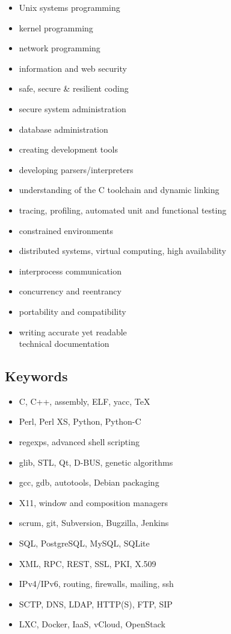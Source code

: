 \documentclass[a4paper,12pt]{article}
\newcommand{\compress}{\setlength\itemsep{-\parskip}}
\newenvironment{compressedItemize}{\begin{itemize}\compress}{\end{itemize}}
\begin{document}
\begin{multicols}{3}
\begin{compressedItemize}
\item	Unix systems programming
\item	kernel programming
\item	network programming
\item	information and web security
\item	safe, secure \& resilient coding
\item	secure system administration
\item	database administration
\columnbreak
\item	creating development tools
\item	developing parsers/interpreters
\item	understanding of the C tool\-chain and dynamic linking
\item	tracing, profiling, automated unit and functional testing
\item	constrained environments
\columnbreak
\item	distributed systems,
	virtual computing,
	high availability
\item	interprocess communication
\item	concurrency and reentrancy
\item	portability and compatibility
\item	writing accurate yet readable \\
	technical documentation
\end{compressedItemize}
\end{multicols}

\subsection*{Keywords}

\begin{multicols}{2}
\begin{compressedItemize}
\item	C, C++, assembly, ELF, yacc, \TeX
\item	Perl, Perl XS, Python, Python-C
\item	regexps, advanced shell scripting
\item	glib, STL, Qt, D-BUS, genetic algorithms
\item	gcc, gdb, autotools, Debian packaging
\item	X11, window and composition managers
\columnbreak
\item	scrum, git, Subversion, Bugzilla, Jenkins
\item	SQL, PostgreSQL, MySQL, SQLite
\item	XML, RPC, REST, SSL, PKI, X.509
\item	IPv4/IPv6, routing, firewalls, mailing, ssh
\item	SCTP, DNS, LDAP, HTTP(S), FTP, SIP
\item	LXC, Docker, IaaS, vCloud, OpenStack
\end{compressedItemize}
\end{multicols}
\end{document}
